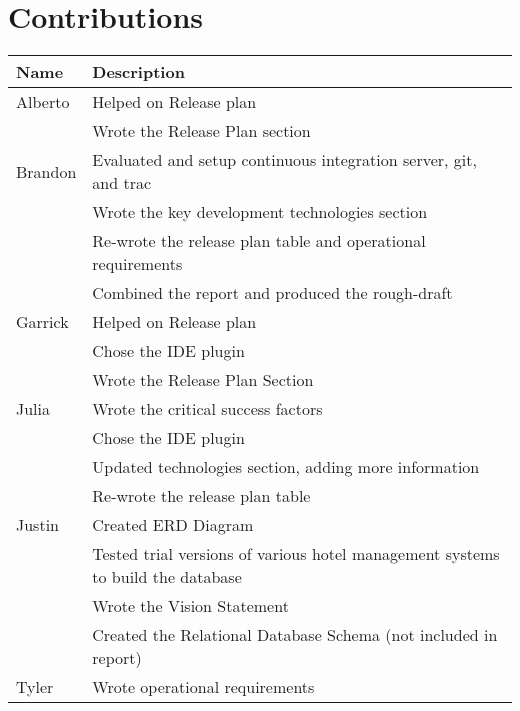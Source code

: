 \section{Contributions}
\begin{tabular}{| l | l |}
\hline
Name & Description \\
\hline
Alberto & Helped on Release plan  \\
& Wrote the Release Plan section \\
\hline
Brandon & Evaluated and setup continuous integration server, git, and trac\\
 & Wrote the key development technologies section \\
 & Re-wrote the release plan table and operational requirements \\
 & Combined the report and produced the rough-draft \\
\hline
Garrick & Helped on Release plan \\
 & Chose the IDE plugin \\
 & Wrote the Release Plan Section \\
\hline
Julia & Wrote the critical success factors \\
 & Chose the IDE plugin \\
 & Updated technologies section, adding more information \\
 & Re-wrote the release plan table \\
\hline
Justin & Created ERD Diagram \\
& Tested trial versions of various hotel management systems to build the database \\
& Wrote the Vision Statement \\
& Created the Relational Database Schema (not included in report) \\
\hline
Tyler & Wrote operational requirements \\
\hline
\end{tabular}
